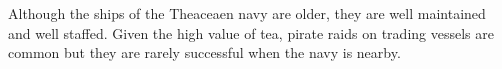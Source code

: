 Although the ships of the Theaceaen navy are older, they are well maintained and well staffed.
Given the high value of tea, pirate raids on trading vessels are common but they are rarely successful when the navy is nearby.
